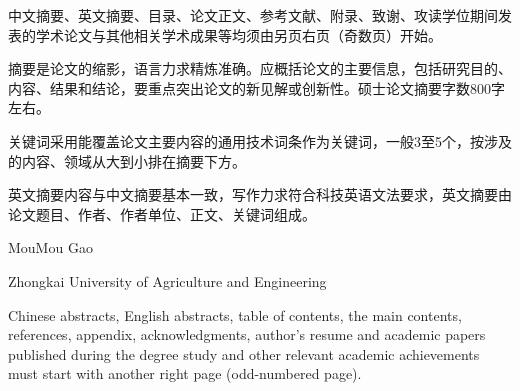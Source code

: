 \intobmk*{\cleardoublepage}{\coverNameMark~\titleMark}
\pagecolor{orange}
\makeTitle
\pagecolor{white}
\makeTitle

\makespine

\makeDeclaration

\intobmk*{\cleardoublepage}{\abstractNameMark}
\begin{center}
    \heiti\bfseries{}\abstractName
    \thispagestyle{plain}
\end{center}


中文摘要、英文摘要、目录、论文正文、参考文献、附录、致谢、攻读学位期间发表的学术论文与其他相关学术成果等均须由另页右页（奇数页）开始。

摘要是论文的缩影，语言力求精炼准确。应概括论文的主要信息，包括研究目的、内容、结果和结论，要重点突出论文的新见解或创新性。硕士论文摘要字数800字左右。

关键词采用能覆盖论文主要内容的通用技术词条作为关键词，一般3至5个，按涉及的内容、领域从大到小排在摘要下方。

英文摘要内容与中文摘要基本一致，写作力求符合科技英语文法要求，英文摘要由论文题目、作者、作者单位、正文、关键词组成。



\intobmk*{\cleardoublepage}{\enAbstractNameMark}
\begin{center}
    {\heiti\bfseries{}\enTitleValue}

    MouMou Gao

    Zhongkai University of Agriculture and Engineering
    \thispagestyle{plain}
\end{center}

{
    \vspace{\baselineskip}
    \noindent\bfseries{\enAbstractName}
}


Chinese abstracts, English abstracts, table of contents, the main contents, references, appendix, acknowledgments, author's resume and academic papers published during the degree study and other relevant academic achievements must start with another right page (odd-numbered page).


